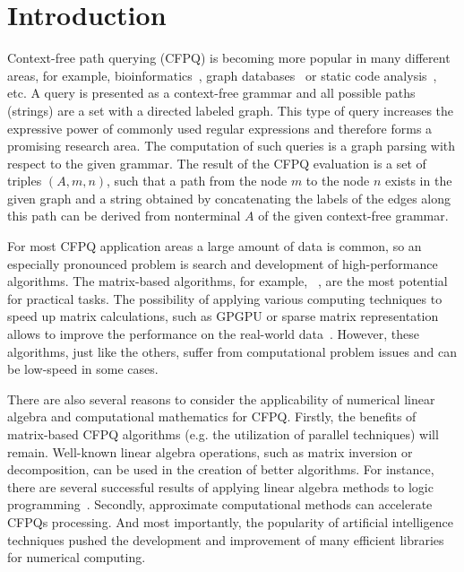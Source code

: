 \documentclass[sigconf]{acmart}
\begin{document}
\section{Introduction}

Context-free path querying (CFPQ) is becoming more popular in many different areas, for example, bioinformatics~\cite{Bio}, graph \linebreak databases~\cite{graphDB} or static code analysis~\cite{zhang2013fast}, etc. 
A query is presented as a context-free grammar and all possible paths (strings) are a set with a directed labeled graph. 
This type of query increases the expressive power of commonly used regular expressions and therefore forms a promising research area.
The computation of such queries is a graph parsing with respect to the given grammar. 
The result of the CFPQ evaluation is a set of triples $(A, m, n)$, such that a path from the node $m$ to the node $n$ exists in the given graph and a string obtained by concatenating the labels of the edges along this path can be derived from nonterminal $A$ of the given context-free grammar.

For most CFPQ application areas a large amount of data is common, so an especially pronounced problem is search and development of high-performance algorithms.
The matrix-based algorithms, for example, ~\cite{azimov2018context}, are the most potential for practical tasks.
The possibility of applying various computing techniques to speed up matrix calculations, such as GPGPU or sparse matrix representation allows to improve the performance on the real-world data~\cite{mishin2019evaluation}.
However, these algorithms, just like the others, suffer from computational problem issues and can be low-speed in some cases.

There are also several reasons to consider the applicability of numerical linear algebra and computational mathematics for CFPQ.
Firstly, the benefits of matrix-based CFPQ algorithms (e.g. the utilization of parallel techniques) will remain.
Well-known linear algebra operations, such as matrix inversion or decomposition, can be used in the creation of better algorithms. 
For instance, there are several successful results of applying linear algebra methods to logic programming~\cite{sato2017linear, aspis2018linear}. 
Secondly, approximate computational methods can accelerate CFPQs processing.
And most importantly, the popularity of artificial intelligence techniques pushed the development and improvement of many efficient libraries for numerical computing.
\end{document}
